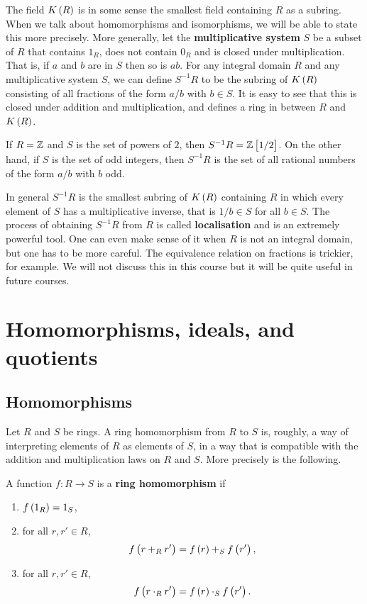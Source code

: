 The field $ K\br{R} $ is in some sense the smallest field containing $ R $ as a subring. When we talk about homomorphisms and isomorphisms, we will be able to state this more precisely. More generally, let the \textbf{multiplicative system} $ S $ be a subset of $ R $ that contains $ 1_R $, does not contain $ 0_R $ and is closed under multiplication. That is, if $ a $ and $ b $ are in $ S $ then so is $ ab $. For any integral domain $ R $ and any multiplicative system $ S $, we can define $ S^{-1}R $ to be the subring of $ K\br{R} $ consisting of all fractions of the form $ a / b $ with $ b \in S $. It is easy to see that this is closed under addition and multiplication, and defines a ring in between $ R $ and $ K\br{R} $.

\begin{example*}
If $ R = \mathbb{Z} $ and $ S $ is the set of powers of $ 2 $, then $ S^{-1}R = \Z\sbr{1 / 2} $. On the other hand, if $ S $ is the set of odd integers, then $ S^{-1}R $ is the set of all rational numbers of the form $ a / b $ with $ b $ odd.
\end{example*}

In general $ S^{-1}R $ is the smallest subring of $ K\br{R} $ containing $ R $ in which every element of $ S $ has a multiplicative inverse, that is $ 1 / b \in S $ for all $ b \in S $. The process of obtaining $ S^{-1}R $ from $ R $ is called \textbf{localisation} and is an extremely powerful tool. One can even make sense of it when $ R $ is not an integral domain, but one has to be more careful. The equivalence relation on fractions is trickier, for example. We will not discuss this in this course but it will be quite useful in future courses.

\pagebreak

\section{Homomorphisms, ideals, and quotients}

\subsection{Homomorphisms}

Let $ R $ and $ S $ be rings. A ring homomorphism from $ R $ to $ S $ is, roughly, a way of interpreting elements of $ R $ as elements of $ S $, in a way that is compatible with the addition and multiplication laws on $ R $ and $ S $. More precisely is the following.

\begin{definition}
A function $ f : R \to S $ is a \textbf{ring homomorphism} if
\begin{enumerate}
\item $ f\br{1_R} = 1_S $,
\item for all $ r, r' \in R $,
$$ f\br{r +_R r'} = f\br{r} +_S f\br{r'}, $$
\item for all $ r, r' \in R $,
$$ f\br{r \cdot_R r'} = f\br{r} \cdot_S f\br{r'}. $$
\end{enumerate}
\end{definition}

